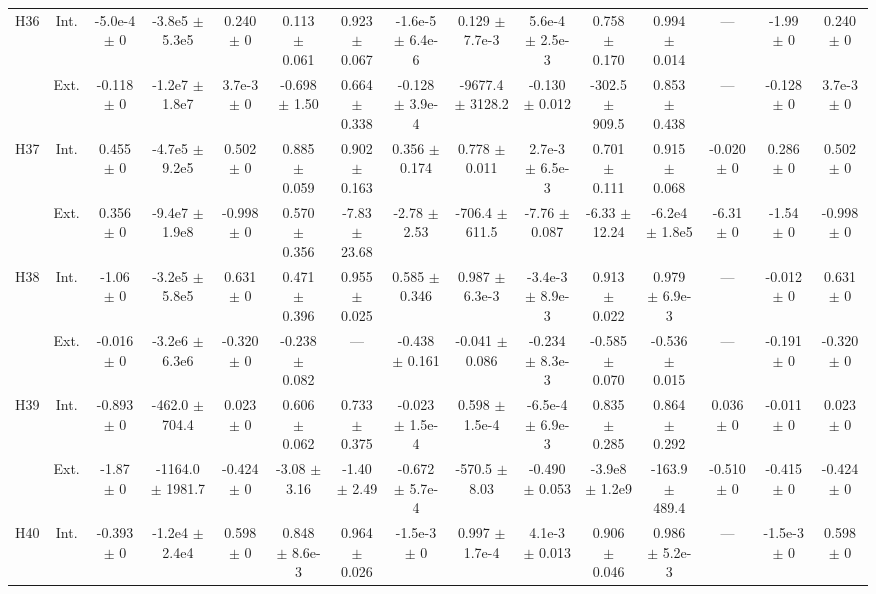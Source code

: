 \begin{table}[htbp]
{\begin{tabular}{@{}ccccccccccccccc@{}}
\cline{2-15}
\multirow{2}{*}{H36} & Int. & -5.0e-4 $\pm$ 0 & -3.8e5 $\pm$ 5.3e5 & 0.240 $\pm$ 0 & 0.113 $\pm$ 0.061 & 0.923 $\pm$ 0.067 & -1.6e-5 $\pm$ 6.4e-6 & 0.129 $\pm$ 7.7e-3 & 5.6e-4 $\pm$ 2.5e-3 & 0.758 $\pm$ 0.170 & 0.994 $\pm$ 0.014 & --- & -1.99 $\pm$ 0 & 0.240 $\pm$ 0 \\
 & Ext. & -0.118 $\pm$ 0 & -1.2e7 $\pm$ 1.8e7 & 3.7e-3 $\pm$ 0 & -0.698 $\pm$ 1.50 & 0.664 $\pm$ 0.338 & -0.128 $\pm$ 3.9e-4 & -9677.4 $\pm$ 3128.2 & -0.130 $\pm$ 0.012 & -302.5 $\pm$ 909.5 & 0.853 $\pm$ 0.438 & --- & -0.128 $\pm$ 0 & 3.7e-3 $\pm$ 0 \\
\cline{2-15}
\multirow{2}{*}{H37} & Int. & 0.455 $\pm$ 0 & -4.7e5 $\pm$ 9.2e5 & 0.502 $\pm$ 0 & 0.885 $\pm$ 0.059 & 0.902 $\pm$ 0.163 & 0.356 $\pm$ 0.174 & 0.778 $\pm$ 0.011 & 2.7e-3 $\pm$ 6.5e-3 & 0.701 $\pm$ 0.111 & 0.915 $\pm$ 0.068 & -0.020 $\pm$ 0 & 0.286 $\pm$ 0 & 0.502 $\pm$ 0 \\
 & Ext. & 0.356 $\pm$ 0 & -9.4e7 $\pm$ 1.9e8 & -0.998 $\pm$ 0 & 0.570 $\pm$ 0.356 & -7.83 $\pm$ 23.68 & -2.78 $\pm$ 2.53 & -706.4 $\pm$ 611.5 & -7.76 $\pm$ 0.087 & -6.33 $\pm$ 12.24 & -6.2e4 $\pm$ 1.8e5 & -6.31 $\pm$ 0 & -1.54 $\pm$ 0 & -0.998 $\pm$ 0 \\
\cline{2-15}
\multirow{2}{*}{H38} & Int. & -1.06 $\pm$ 0 & -3.2e5 $\pm$ 5.8e5 & 0.631 $\pm$ 0 & 0.471 $\pm$ 0.396 & 0.955 $\pm$ 0.025 & 0.585 $\pm$ 0.346 & 0.987 $\pm$ 6.3e-3 & -3.4e-3 $\pm$ 8.9e-3 & 0.913 $\pm$ 0.022 & 0.979 $\pm$ 6.9e-3 & --- & -0.012 $\pm$ 0 & 0.631 $\pm$ 0 \\
 & Ext. & -0.016 $\pm$ 0 & -3.2e6 $\pm$ 6.3e6 & -0.320 $\pm$ 0 & -0.238 $\pm$ 0.082 & --- & -0.438 $\pm$ 0.161 & -0.041 $\pm$ 0.086 & -0.234 $\pm$ 8.3e-3 & -0.585 $\pm$ 0.070 & -0.536 $\pm$ 0.015 & --- & -0.191 $\pm$ 0 & -0.320 $\pm$ 0 \\
\cline{2-15}
\multirow{2}{*}{H39} & Int. & -0.893 $\pm$ 0 & -462.0 $\pm$ 704.4 & 0.023 $\pm$ 0 & 0.606 $\pm$ 0.062 & 0.733 $\pm$ 0.375 & -0.023 $\pm$ 1.5e-4 & 0.598 $\pm$ 1.5e-4 & -6.5e-4 $\pm$ 6.9e-3 & 0.835 $\pm$ 0.285 & 0.864 $\pm$ 0.292 & 0.036 $\pm$ 0 & -0.011 $\pm$ 0 & 0.023 $\pm$ 0 \\
 & Ext. & -1.87 $\pm$ 0 & -1164.0 $\pm$ 1981.7 & -0.424 $\pm$ 0 & -3.08 $\pm$ 3.16 & -1.40 $\pm$ 2.49 & -0.672 $\pm$ 5.7e-4 & -570.5 $\pm$ 8.03 & -0.490 $\pm$ 0.053 & -3.9e8 $\pm$ 1.2e9 & -163.9 $\pm$ 489.4 & -0.510 $\pm$ 0 & -0.415 $\pm$ 0 & -0.424 $\pm$ 0 \\
\cline{2-15}
\multirow{2}{*}{H40} & Int. & -0.393 $\pm$ 0 & -1.2e4 $\pm$ 2.4e4 & 0.598 $\pm$ 0 & 0.848 $\pm$ 8.6e-3 & 0.964 $\pm$ 0.026 & -1.5e-3 $\pm$ 0 & 0.997 $\pm$ 1.7e-4 & 4.1e-3 $\pm$ 0.013 & 0.906 $\pm$ 0.046 & 0.986 $\pm$ 5.2e-3 & --- & -1.5e-3 $\pm$ 0 & 0.598 $\pm$ 0 \\

\end{tabular}}
\end{table}
